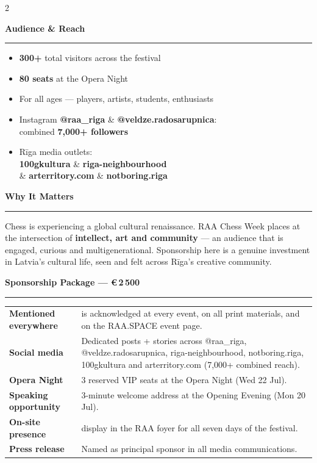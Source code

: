 \documentclass[a4paper,10pt]{article}
\newcommand{\sectionrule}[1]{%
  \vspace{3pt}%
  {\color{raared}\bfseries\large #1}\\[-3pt]%
  {\color{raared}\rule{\linewidth}{0.8pt}}%
  \vspace{2pt}%
}
\begin{document}
\begin{center}
\begin{minipage}{0.90\paperwidth}
\begin{multicols}{2}
\columnbreak

\sectionrule{Audience \& Reach}

{\small
\begin{itemize}[leftmargin=*,itemsep=1.5pt,topsep=0pt]
  \item \textbf{300+} total visitors across the festival
  \item \textbf{80 seats} at the Opera Night
  \item For all ages — players, artists, students, enthusiasts
  \item Instagram \textbf{@raa\_riga} \& \textbf{@veldze.radosarupnica}:\\
        combined \textbf{7,000+ followers}
  \item Rīga media outlets:\\
        \textbf{100gkultura} \& \textbf{riga-neighbourhood} \\ 
        \& \textbf{arterritory.com} \& \textbf{notboring.riga}
\end{itemize}
}

\vspace{0.1cm}
\sectionrule{Why It Matters}

{\small Chess is experiencing a global cultural renaissance. RAA Chess Week places \textbf{\sponsor} at the intersection of \textbf{intellect, art and community} — an audience that is engaged, curious and multigenerational. Sponsorship here is a genuine investment in Latvia's cultural life, seen and felt across Rīga's creative community.}

\end{multicols}

\vspace{0.05cm}

\sectionrule{Sponsorship Package — €\,2\,500}

{\small
\begin{tabularx}{\linewidth}{@{} >{\bfseries}p{3.3cm} X @{}}
Mentioned everywhere  & \sponsor{} is acknowledged at every event, on all print materials, and on the RAA.SPACE event page. \\[2pt]
Social media          & Dedicated posts + stories across @raa\_riga, @veldze.radosarupnica, riga-neighbourhood, notboring.riga, 100gkultura and arterritory.com (7,000+ combined reach). \\[2pt]
Opera Night           & 3 reserved VIP seats at the Opera Night (Wed 22 Jul). \\[2pt]
Speaking opportunity  & 3-minute welcome address at the Opening Evening (Mon 20 Jul). \\[2pt]
On-site presence      & \sponsor{} display in the RAA foyer for all seven days of the festival. \\[2pt]
Press release         & Named as principal sponsor in all media communications. \\
\end{tabularx}
}


\end{minipage}
\end{center}
\end{document}
